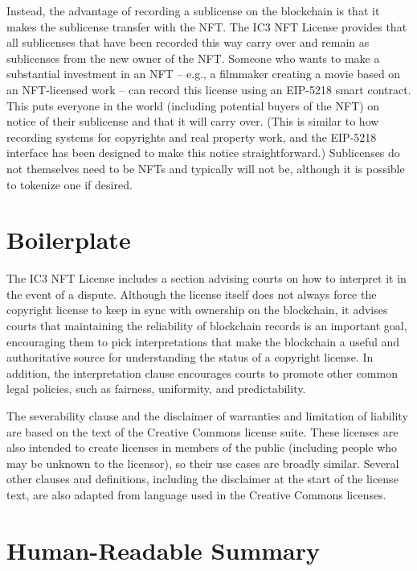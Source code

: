 \documentclass{article}
\newcommand{\eiplicense}{EIP-5218\xspace}
\newcommand{\iccclicense}{IC3 NFT License\xspace}
\begin{document}
Instead, the advantage of recording a sublicense on the blockchain is that it makes the sublicense transfer with the NFT. The \iccclicense provides that all sublicenses that have been recorded this way carry over and remain as sublicenses from the new owner of the NFT. Someone who wants to make a substantial investment in an NFT -- e.g., a filmmaker creating a movie based on an NFT-licensed work -- can record this license using an \eiplicense smart contract. This puts everyone in the world (including potential buyers of the NFT) on notice of their sublicense and that it will carry over. (This is similar to how recording systems for copyrights and real property work, and the \eiplicense interface has been designed to make this notice straightforward.)  Sublicenses do not themselves need to be NFTs and typically will not be, although it is possible to tokenize one if desired.



\section{Boilerplate}

The \iccclicense includes a section advising courts on how to interpret it in the event of a dispute. Although the license itself does not always force the copyright license to keep in sync with ownership on the blockchain, it advises courts that maintaining the reliability of blockchain records is an important goal, encouraging them to pick interpretations that make the blockchain a useful and authoritative source for understanding the status of a copyright license. In addition, the interpretation clause encourages courts to promote other common legal policies, such as fairness, uniformity, and predictability.

The severability clause and the disclaimer of warranties and limitation of liability are based on the text of the Creative Commons license suite. These licenses are also intended to create licenses in members of the public (including people who may be unknown to the licensor), so their use cases are broadly similar. Several other clauses and definitions, including the disclaimer at the start of the license text, are also adapted from language used in the Creative Commons licenses.

\appendix

\section{Human-Readable Summary}
\label{sec:human}
\end{document}
